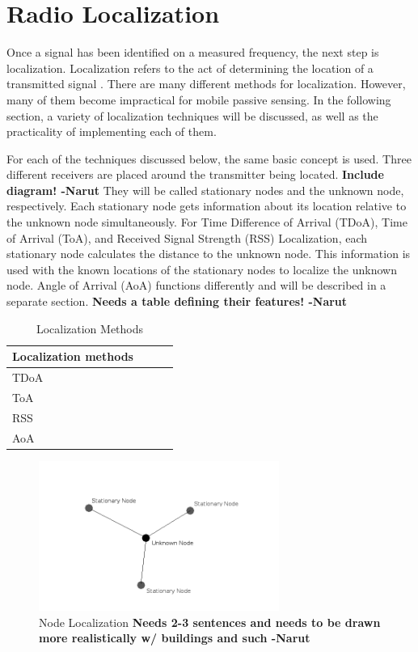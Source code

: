 \section{Radio Localization}
Once a signal has been identified on a measured frequency, the next step is localization. Localization refers to the act of determining the location of a transmitted signal \cite{local_conf}. There are many different methods for localization. However, many of them become impractical for mobile passive sensing. In the following section, a variety of localization techniques will be discussed, as well as the practicality of implementing each of them.\par
For each of the techniques discussed below, the same basic concept is used. Three different receivers are placed around the transmitter being located. \textbf{Include diagram! -Narut} They will be called stationary nodes and the unknown node, respectively. Each stationary node gets information about its location relative to the unknown node simultaneously. For Time Difference of Arrival (TDoA), Time of Arrival (ToA), and Received Signal Strength (RSS) Localization, each stationary node calculates the distance to the unknown node. This information is used with the known locations of the stationary nodes to localize the unknown node. Angle of Arrival (AoA) functions differently and will be described in a separate section. \textbf{Needs a table defining their features! -Narut}
\begin{table}[ht]
\centering
\caption{Localization Methods}
\label{table:local_methods}
\begin{tabular}{|l|l|l|l|}
    \hline
  Localization methods  & & &  \\ \hline
         TDoA           & & & \\
          ToA           & & & \\
          RSS           & & & \\
          AoA           & & & \\
    \hline
\end{tabular}
\end{table}\par
\begin{figure}[ht]
\centering
\includegraphics[width=0.70\textwidth]{img/node-localization-lines.png}
\caption{Node Localization \textbf{Needs 2-3 sentences and needs to be drawn more realistically w/ buildings and such -Narut}}
\label{fig:node_localization}
\end{figure}\par
